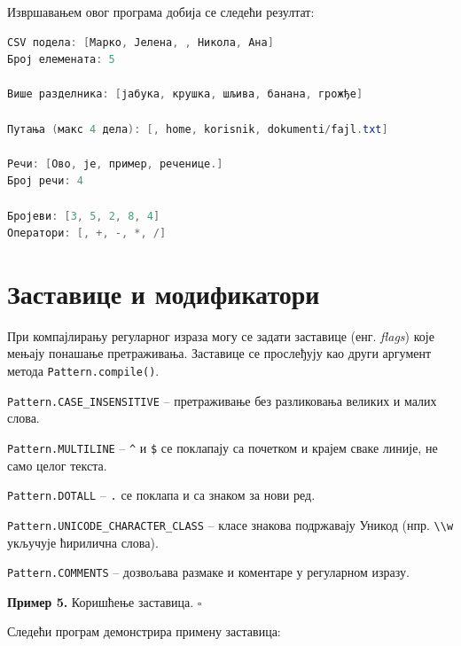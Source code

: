 Извршавањем овог програма добија се следећи резултат:


\begin{lstlisting}[language=Java]
CSV подела: [Марко, Јелена, , Никола, Ана]
Број елемената: 5
 
Више разделника: [јабука, крушка, шљива, банана, грожђе]
 
Путања (макс 4 дела): [, home, korisnik, dokumenti/fajl.txt]
 
Речи: [Ово, је, пример, реченице.]
Број речи: 4
 
Бројеви: [3, 5, 2, 8, 4]
Оператори: [, +, -, *, /]
\end{lstlisting}


\section{Заставице и модификатори}

При компајлирању регуларног израза могу се задати заставице (енг. \textit{flags}) које мењају понашање претраживања. Заставице се прослеђују као други аргумент метода \texttt{Pattern.compile()}.

\texttt{Pattern.CASE\_INSENSITIVE} – претраживање без разликовања великих и малих слова.

\texttt{Pattern.MULTILINE} – \texttt{\textasciicircum{}} и \texttt{\$} се поклапају са почетком и крајем сваке линије, не само целог текста.

\texttt{Pattern.DOTALL} – \texttt{.} се поклапа и са знаком за нови ред.

\texttt{Pattern.UNICODE\_CHARACTER\_CLASS} – класе знакова подржавају Уникод (нпр. \texttt{\textbackslash{}\textbackslash{}w} укључује ћирилична слова).

\texttt{Pattern.COMMENTS} – дозвољава размаке и коментаре у регуларном изразу.


\bigskip

\noindent \textbf{Пример 5.} Коришћење заставица. $\square$

\medskip

Следећи програм демонстрира примену заставица:


